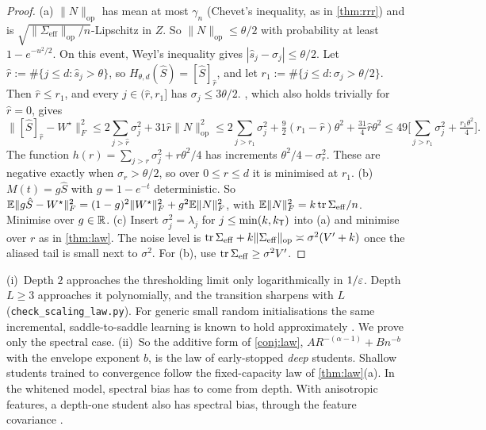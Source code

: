 \begin{proof}
(a) $\|N\|_{\mathrm{op}}$ has mean at most $\gamma_n$ (Chevet's inequality, as in \cref{thm:rrr}) and is
$\sqrt{\|\Sigma_{\mathrm{eff}}\|_{\mathrm{op}}/n}$-Lipschitz in $Z$. So $\|N\|_{\mathrm{op}}\le\theta/2$ with probability at least $1-e^{-u^2/2}$. On this event,
Weyl's inequality gives $|\hat s_j-\sigma_j|\le\theta/2$. Let $\hat r:=\#\{j\le d:\hat s_j>\theta\}$, so $H_{\theta,d}(\hat S)=[\hat S]_{\hat r}$, and let
$r_1:=\#\{j\le d:\sigma_j>\theta/2\}$. Then $\hat r\le r_1$, and every $j\in(\hat r,r_1]$ has $\sigma_j\le3\theta/2$. , which also
holds trivially for $\hat r=0$, gives
\[
\|[\hat S]_{\hat r}-W^\star\|_F^2\le2\sum_{j>\hat r}\sigma_j^2+31\hat r\|N\|_{\mathrm{op}}^2\le2\sum_{j>r_1}\sigma_j^2+\tfrac92(r_1-\hat r)\theta^2+\tfrac{31}4\hat r\theta^2\le49\Big[\sum_{j>r_1}\sigma_j^2+\tfrac{r_1\theta^2}4\Big].
\]
The function $h(r)=\sum_{j>r}\sigma_j^2+r\theta^2/4$ has increments $\theta^2/4-\sigma_r^2$. These are negative exactly when $\sigma_r>\theta/2$,
so over $0\le r\le d$ it is minimised at $r_1$.
(b) $M(t)=g\hat S$ with $g=1-e^{-t}$ deterministic. So $\mathbb{E}\|g\hat S-W^\star\|_F^2=(1-g)^2\|W^\star\|_F^2+g^2\mathbb{E}\|N\|_F^2$, with
$\mathbb{E}\|N\|_F^2=k\operatorname{tr}\Sigma_{\mathrm{eff}}/n$. Minimise over $g\in\mathbb{R}$.
(c) Insert $\sigma_j^2=\lambda_j$ for $j\le\min(k,k_{\mathsf{T}})$ into (a) and minimise over $r$ as in \cref{thm:law}. The noise level is
$\operatorname{tr}\Sigma_{\mathrm{eff}}+k\|\Sigma_{\mathrm{eff}}\|_{\mathrm{op}}\asymp\sigma^2(V'+k)$ once the aliased tail is small next to $\sigma^2$. For (b), use $\operatorname{tr}\Sigma_{\mathrm{eff}}\ge\sigma^2V'$.
\end{proof}

\begin{remark}\label{rem:depth}
(i)~Depth $2$ approaches the thresholding limit only logarithmically in $1/\varepsilon$. Depth $L\ge3$ approaches it
polynomially, and the transition sharpens with $L$ (\texttt{check\_scaling\_law.py}). For generic small random
initialisations the same incremental, saddle-to-saddle learning is known to hold approximately
\citep{saxe2014exact,gidel2019implicit,arora2019implicit,jacot2021saddle}. We prove only the spectral case.
(ii)~So the additive form of \cref{conj:law}, $AR^{-(\alpha-1)}+Bn^{-b}$ with the envelope exponent $b$, is the law of
early-stopped \emph{deep} students. Shallow students trained to convergence follow the fixed-capacity law of
\cref{thm:law}(a). In the whitened model, spectral bias has to come from depth. With anisotropic features, a
depth-one student also has spectral bias, through the feature covariance
\citep{bach2024high,lin2024scaling,paquette2024phases}.
\end{remark}

